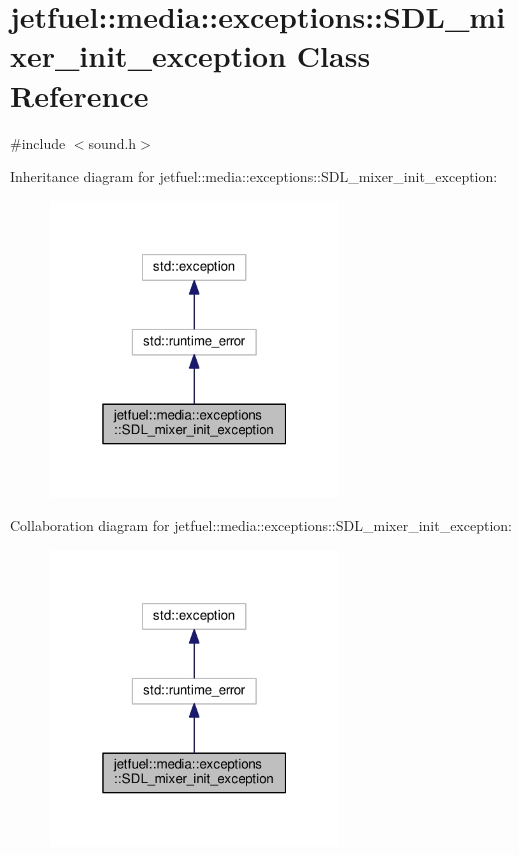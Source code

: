 \hypertarget{classjetfuel_1_1media_1_1exceptions_1_1SDL__mixer__init__exception}{}\section{jetfuel\+:\+:media\+:\+:exceptions\+:\+:S\+D\+L\+\_\+mixer\+\_\+init\+\_\+exception Class Reference}
\label{classjetfuel_1_1media_1_1exceptions_1_1SDL__mixer__init__exception}


{\ttfamily \#include $<$sound.\+h$>$}



Inheritance diagram for jetfuel\+:\+:media\+:\+:exceptions\+:\+:S\+D\+L\+\_\+mixer\+\_\+init\+\_\+exception\+:
\nopagebreak
\begin{figure}[H]
\begin{center}
\leavevmode
\includegraphics[width=217pt]{classjetfuel_1_1media_1_1exceptions_1_1SDL__mixer__init__exception__inherit__graph}
\end{center}
\end{figure}


Collaboration diagram for jetfuel\+:\+:media\+:\+:exceptions\+:\+:S\+D\+L\+\_\+mixer\+\_\+init\+\_\+exception\+:
\nopagebreak
\begin{figure}[H]
\begin{center}
\leavevmode
\includegraphics[width=217pt]{classjetfuel_1_1media_1_1exceptions_1_1SDL__mixer__init__exception__coll__graph}
\end{center}
\end{figure}
